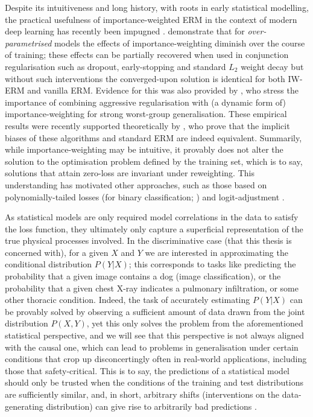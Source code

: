 Despite its intuitiveness and long history, with roots in early statistical modelling, the
practical usefulness of importance-weighted ERM in the context of modern deep learning has recently
been impugned \citep{byrd2019effect, zhai2022understanding}.
%
\cite{byrd2019effect} demonstrate that for \emph{over-parametrised} models the effects of
importance-weighting diminish over the course of training; these effects can be partially recovered
when used in conjunction regularisation such as dropout, early-stopping and standard \(L_2\) weight
decay but without such interventions the converged-upon solution is identical for both IW-ERM and
vanilla ERM. 
%
Evidence for this was also provided by \cite{sagawa2019distributionally}, who stress the importance
of combining aggressive regularisation with (a dynamic form of) importance-weighting for strong
worst-group generalisation.
%
These empirical results were recently supported theoretically by \cite{zhai2022understanding}, who
prove that the implicit biases of these algorithms and standard ERM are indeed equivalent.
%
Summarily, while importance-weighting may be intuitive, it provably does not alter the solution to
the optimisation problem defined by the training set, which is to say, solutions that attain
zero-loss are invariant under reweighting.
%
This understanding has motivated other approaches, such as those based on polynomially-tailed
losses (for binary classification; \cite{wang2021importance}) and logit-adjustment
\citep{menon2020long}.
%

As statistical models are only required model correlations in the data to satisfy the loss
function, they ultimately only capture a superficial representation of the true physical processes
involved.
%
In the discriminative case (that this thesis is concerned with), for a given \( X \) and \( Y \) we
are interested in approximating the conditional distribution \( P(Y|X) \); this  corresponds to
tasks like predicting the probability that a given image contains a dog (image classification), or
the probability that a given chest X-ray indicates a pulmonary infiltration, or some other thoracic
condition.
%
Indeed, the task of accurately estimating \( P(Y | X) \) can be provably solved by observing a
sufficient amount of \iid{} data drawn from the joint distribution \( P(X,Y) \), yet this only
solves the problem from the aforementioned statistical perspective, and we will see that this
perspective is not always aligned with the causal one, which can lead to problems in generalisation
under certain conditions that crop up disconcertingly often in real-world applications, including
those that safety-critical.
%
This is to say, the predictions of a statistical model should only be trusted when the conditions
of the training and test distributions are sufficiently similar, and, in short, arbitrary shifts
(interventions on the data-generating distribution) can give rise to arbitrarily bad predictions
\citep{pearl2009causality, scholkopf2012causal}.

